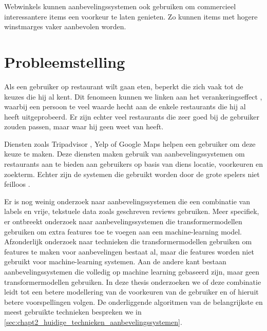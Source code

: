 Webwinkels kunnen aanbevelingssystemen ook gebruiken om commercieel interessantere items een voorkeur te laten genieten. Zo kunnen items met hogere winstmarges vaker aanbevolen worden.


\section{Probleemstelling}
Als een gebruiker op restaurant wilt gaan eten, beperkt die zich vaak tot de keuzes die hij al kent. Dit fenomeen kunnen we linken aan het verankeringseffect \cite{anchoring_effect}, waarbij een persoon te veel waarde hecht aan de enkele restaurants die hij al heeft uitgeprobeerd. Er zijn echter veel restaurants die zeer goed bij de gebruiker zouden passen, maar waar hij geen weet van heeft.

Diensten zoals Tripadvisor \cite{tripadvisor_algorithm}, Yelp of Google Maps helpen een gebruiker om deze keuze te maken. Deze diensten maken gebruik van aanbevelingssystemen om restaurants aan te bieden aan gebruikers op basis van diens locatie, voorkeuren en zoekterm. Echter zijn de systemen die gebruikt worden door de grote spelers niet feilloos \cite{recsys_bad, recsys_youtube_bad}. 

Er is nog weinig onderzoek naar aanbevelingssystemen die een combinatie van labels en vrije, tekstuele data zoals geschreven reviews gebruiken. Meer specifiek, er ontbreekt onderzoek naar aanbevelingssystemen die transformermodellen gebruiken om extra features toe te voegen aan een machine-learning model. Afzonderlijk onderzoek naar technieken die transformermodellen gebruiken om features te maken voor aanbevelingen bestaat al, maar die features worden niet gebruikt voor machine-learning systemen. \cite{masterthesis_nlp_italie} Aan de andere kant bestaan aanbevelingssystemen die volledig op machine learning gebaseerd zijn, maar geen transformermodellen gebruiken. \cite{deepconn} In deze thesis onderzoeken we of deze combinatie leidt tot een betere modellering van de voorkeuren van de gebruiker en of hieruit betere voorspellingen volgen. De onderliggende algoritmen van de belangrijkste en meest gebruikte technieken bespreken we in \autoref{sec:chapt2_huidige_technieken_aanbevelingssystemen}. 


